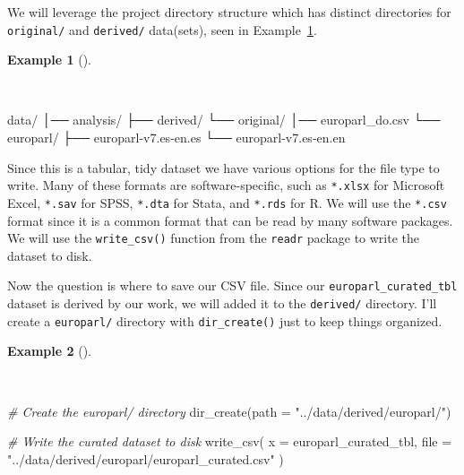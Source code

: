 \documentclass[
  letterpaper,
  DIV=11,
  numbers=noendperiod]{scrreport}
\newenvironment{Shaded}{\begin{snugshade}}{\end{snugshade}}
\newcommand{\AttributeTok}[1]{\textcolor[rgb]{0.00,0.00,0.00}{#1}}
\newcommand{\CommentTok}[1]{\textcolor[rgb]{0.00,0.00,0.00}{\textit{#1}}}
\newcommand{\ExtensionTok}[1]{\textcolor[rgb]{0.00,0.00,0.00}{#1}}
\newcommand{\FunctionTok}[1]{\textcolor[rgb]{0.00,0.00,0.00}{#1}}
\newcommand{\NormalTok}[1]{\textcolor[rgb]{0.00,0.00,0.00}{#1}}
\newcommand{\StringTok}[1]{\textcolor[rgb]{0.00,0.00,0.00}{#1}}
\theoremstyle{definition}
\newtheorem{example}{Example}[chapter]
\theoremstyle{remark}
\begin{document}
We will leverage the project directory structure which has distinct
directories for \texttt{original/} and \texttt{derived/} data(sets),
seen in Example~\ref{exm-cd-europarl-write-directory}.

\begin{example}[]\protect\hypertarget{exm-cd-europarl-write-directory}{}\label{exm-cd-europarl-write-directory}

~

\begin{Shaded}
\begin{Highlighting}[]
\ExtensionTok{data/}
\ExtensionTok{│──}\NormalTok{ analysis/}
\ExtensionTok{├──}\NormalTok{ derived/}
\ExtensionTok{└──}\NormalTok{ original/}
    \ExtensionTok{│──}\NormalTok{ europarl\_do.csv}
    \ExtensionTok{└──}\NormalTok{ europarl/}
        \ExtensionTok{├──}\NormalTok{ europarl{-}v7.es{-}en.es}
        \ExtensionTok{└──}\NormalTok{ europarl{-}v7.es{-}en.en}
\end{Highlighting}
\end{Shaded}

\end{example}

Since this is a tabular, tidy dataset we have various options for the
file type to write. Many of these formats are software-specific, such as
\texttt{*.xlsx} for Microsoft Excel, \texttt{*.sav} for SPSS,
\texttt{*.dta} for Stata, and \texttt{*.rds} for R. We will use the
\texttt{*.csv} format since it is a common format that can be read by
many software packages. We will use the \texttt{write\_csv()} function
from the \texttt{readr} package to write the dataset to disk.

Now the question is where to save our CSV file. Since our
\texttt{europarl\_curated\_tbl} dataset is derived by our work, we will
added it to the \texttt{derived/} directory. I'll create a
\texttt{europarl/} directory with \texttt{dir\_create()} just to keep
things organized.

\begin{example}[]\protect\hypertarget{exm-cd-unstructured-write-europarl}{}\label{exm-cd-unstructured-write-europarl}

~

\begin{Shaded}
\begin{Highlighting}[]
\CommentTok{\# Create the europarl/ directory}
\FunctionTok{dir\_create}\NormalTok{(}\AttributeTok{path =} \StringTok{"../data/derived/europarl/"}\NormalTok{)}

\CommentTok{\# Write the curated dataset to disk}
\FunctionTok{write\_csv}\NormalTok{(}
  \AttributeTok{x =}\NormalTok{ europarl\_curated\_tbl,}
  \AttributeTok{file =} \StringTok{"../data/derived/europarl/europarl\_curated.csv"}
\NormalTok{) }
\end{Highlighting}
\end{Shaded}

\end{example}
\end{document}
